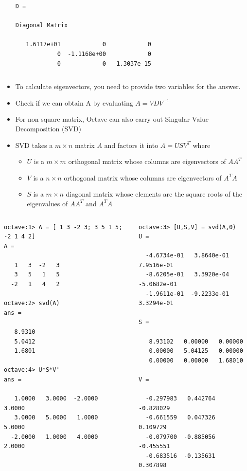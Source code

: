 \documentclass[slidestop,mathserif,compress,xcolor=svgnames]{beamer}
\begin{document}
\begin{frame}
\begin{itemize}
{\begin{columns}
\begin{verbatim}
D =

Diagonal Matrix

   1.6117e+01            0            0
            0  -1.1168e+00            0
            0            0  -1.3037e-15
        \end{verbatim}
      \end{columns}
    }
    \item To calculate eigenvectors, you need to provide two variables for the answer.
    \item Check if we can obtain A by evaluating $A=VDV^{-1}$
    \framebreak
    \item For non square matrix, Octave can also carry out Singular Value Decomposition (SVD)
    \item SVD takes a $m\times n$ matrix $A$ and factors it into $A = USV^{T}$ where
    \begin{itemize}
      \item $U$ is a $m \times m$ orthogonal matrix whose columns are eigenvectors of $AA^T$ 
      \item $V$ is a $n \times n$ orthogonal matrix whose columns are eigenvectors of $A^TA$ 
      \item $S$ is a $m \times n$ diagonal matrix whose elements are the square roots of the eigenvalues of $AA^T$ and $A^TA$ 
    \end{itemize}
  \end{itemize}
    {\tiny
      \vspace{-0.2cm}
      \begin{columns}
        \column{5cm}
        \begin{verbatim}
octave:1> A = [ 1 3 -2 3; 3 5 1 5; -2 1 4 2]
A =

   1   3  -2   3
   3   5   1   5
  -2   1   4   2

octave:2> svd(A)
ans =

   8.9310
   5.0412
   1.6801

octave:4> U*S*V'
ans =

   1.0000   3.0000  -2.0000   3.0000
   3.0000   5.0000   1.0000   5.0000
  -2.0000   1.0000   4.0000   2.0000
        \end{verbatim}
        \column{5cm}
        \begin{verbatim}
octave:3> [U,S,V] = svd(A,0)
U =

  -4.6734e-01   3.8640e-01   7.9516e-01
  -8.6205e-01   3.3920e-04  -5.0682e-01
  -1.9611e-01  -9.2233e-01   3.3294e-01

S =

   8.93102   0.00000   0.00000
   0.00000   5.04125   0.00000
   0.00000   0.00000   1.68010

V =

  -0.297983   0.442764  -0.828029
  -0.661559   0.047326   0.109729
  -0.079700  -0.885056  -0.455551
  -0.683516  -0.135631   0.307898
        \end{verbatim}
      \end{columns}
    }
\end{frame}
\end{document}
